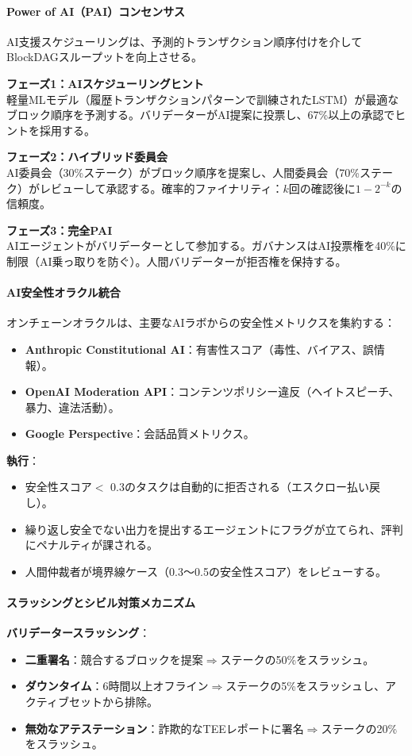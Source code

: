 \documentclass[11pt]{article}
\begin{document}
\paragraph{Power of AI（PAI）コンセンサス}
AI支援スケジューリングは、予測的トランザクション順序付けを介してBlockDAGスループットを向上させる。

\textbf{フェーズ1：AIスケジューリングヒント}\\
軽量MLモデル（履歴トランザクションパターンで訓練されたLSTM）が最適なブロック順序を予測する。バリデーターがAI提案に投票し、67\%以上の承認でヒントを採用する。

\textbf{フェーズ2：ハイブリッド委員会}\\
AI委員会（30\%ステーク）がブロック順序を提案し、人間委員会（70\%ステーク）がレビューして承認する。確率的ファイナリティ：$k$回の確認後に$1 - 2^{-k}$の信頼度。

\textbf{フェーズ3：完全PAI}\\
AIエージェントがバリデーターとして参加する。ガバナンスはAI投票権を40\%に制限（AI乗っ取りを防ぐ）。人間バリデーターが拒否権を保持する。

\paragraph{AI安全性オラクル統合}
オンチェーンオラクルは、主要なAIラボからの安全性メトリクスを集約する：
\begin{itemize}[noitemsep]
  \item \textbf{Anthropic Constitutional AI}：有害性スコア（毒性、バイアス、誤情報）。
  \item \textbf{OpenAI Moderation API}：コンテンツポリシー違反（ヘイトスピーチ、暴力、違法活動）。
  \item \textbf{Google Perspective}：会話品質メトリクス。
\end{itemize}

\textbf{執行}：
\begin{itemize}[noitemsep]
  \item 安全性スコア$<$ 0.3のタスクは自動的に拒否される（エスクロー払い戻し）。
  \item 繰り返し安全でない出力を提出するエージェントにフラグが立てられ、評判にペナルティが課される。
  \item 人間仲裁者が境界線ケース（0.3〜0.5の安全性スコア）をレビューする。
\end{itemize}

\paragraph{スラッシングとシビル対策メカニズム}
\textbf{バリデータースラッシング}：
\begin{itemize}[noitemsep]
  \item \textbf{二重署名}：競合するブロックを提案$\Rightarrow$ステークの50\%をスラッシュ。
  \item \textbf{ダウンタイム}：6時間以上オフライン$\Rightarrow$ステークの5\%をスラッシュし、アクティブセットから排除。
  \item \textbf{無効なアテステーション}：詐欺的なTEEレポートに署名$\Rightarrow$ステークの20\%をスラッシュ。
\end{itemize}
\end{document}
